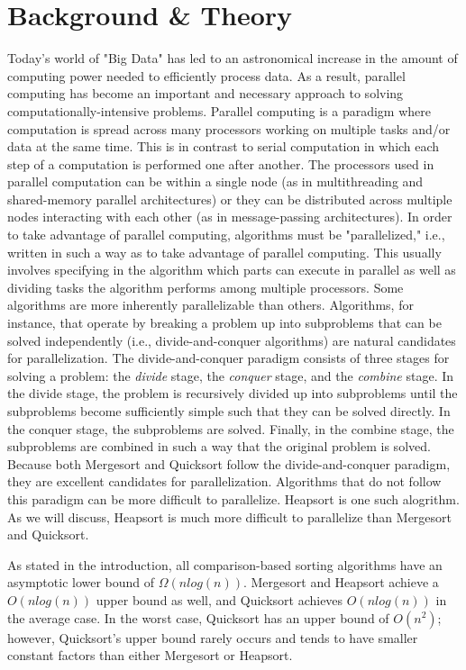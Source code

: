\documentclass[conference]{IEEEtran}
\begin{document}
    \section{Background \& Theory}
    Today's world of "Big Data" has led to an astronomical increase in the amount of computing power needed to efficiently process data.
    As a result, parallel computing has become an important and necessary approach to solving computationally-intensive problems.
    Parallel computing is a paradigm where computation is spread across many processors working on multiple tasks and/or data at the same time. This is in contrast to serial computation in which each step of a computation is performed one after another.
    The processors used in parallel computation can be within a single node (as in multithreading and shared-memory parallel architectures) or they can be distributed across multiple nodes interacting with each other (as in message-passing architectures). In order to take advantage of parallel computing, algorithms must be "parallelized," i.e., written in such a way as to take advantage of parallel computing. This usually involves specifying in the algorithm which parts can execute in parallel as well as dividing tasks the algorithm performs among multiple processors. Some algorithms are more inherently parallelizable than others. Algorithms, for instance, that operate by breaking a problem up into subproblems that can be solved independently (i.e., divide-and-conquer algorithms) are natural candidates for parallelization. The divide-and-conquer paradigm consists of three stages for solving a problem: the \textit{divide} stage, the \textit{conquer} stage, and the \textit{combine} stage. In the divide stage, the problem is recursively divided up into subproblems until the subproblems become sufficiently simple such that they can be solved directly. In the conquer stage, the subproblems are solved. Finally, in the combine stage, the subproblems are combined in such a way that the original problem is solved. Because both Mergesort and Quicksort follow the divide-and-conquer paradigm, they are excellent candidates for parallelization. Algorithms that do not follow this paradigm can be more difficult to parallelize. Heapsort is one such alogrithm. As we will discuss, Heapsort is much more difficult to parallelize than Mergesort and Quicksort.
    
    As stated in the introduction, all comparison-based sorting algorithms have an asymptotic lower bound of $\Omega(nlog(n))$. 
    Mergesort and Heapsort achieve a $O(nlog(n))$ upper bound as well, and Quicksort achieves $O(nlog(n))$ in the average case. In the worst case, Quicksort has an upper bound of $O(n^2)$; 
    however, Quicksort's upper bound rarely occurs and tends to have smaller constant factors than either Mergesort or Heapsort. \cite{hoare_algorithm_1961} %
    
\end{document}
